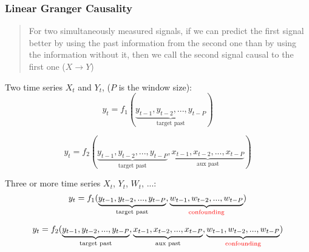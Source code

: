 \documentclass[11pt]{beamer}
\begin{document}
\begin{frame}
  \frametitle{\normalsize{\textbf{
        Linear Granger Causality
  }}}

  \scriptsize{

    \begin{quote}
      For two simultaneously measured signals, if we can predict the first
      signal better by using the past information from the second one than by
      using the information without it, then we call the second signal causal to
      the first one ($X \rightarrow Y$)
    \end{quote}
    
    \textbullet \: Two time series $X_t$ and $Y_t$, ($P$ is the window size):
    $$
    y_t= f_1(\underbrace{y_{t-1}, y_{t-2}, ..., y_{t-P}}_{\text{target past}})
    $$

    $$
    y_t = f_2(\underbrace{y_{t-1}, y_{t-2}, ..., y_{t-P}}_{\text{target past}},
    \underbrace{x_{t-1}, x_{t-2}, ..., x_{t-P}}_{\text{aux past}})
    $$

    \textbullet \: Three or more time series $X_t$, $Y_t$, $W_t$, ...:
    $$
    y_t= f_1(\underbrace{y_{t-1}, y_{t-2}, ..., y_{t-P}}_{\text{target past}},
    \underbrace{w_{t-1}, w_{t-2}, ..., w_{t-P}}_{\text{\textcolor{red}{confounding}}})
    $$

    $$
    y_t = f_2(\underbrace{y_{t-1}, y_{t-2}, ..., y_{t-P}}_{\text{target past}},
    \underbrace{x_{t-1}, x_{t-2}, ..., x_{t-P}}_{\text{aux past}},
    \underbrace{w_{t-1}, w_{t-2}, ..., w_{t-P}}_{\text{\textcolor{red}{confounding}}})
    $$    
    
  }
 
\end{frame}
\end{document}
